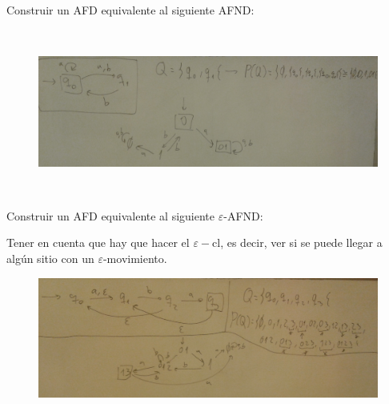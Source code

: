 \documentclass[twoside]{article}
\begin{document}
\begin{ejercicio}{11}
Construir un AFD equivalente al siguiente AFND:
\end{ejercicio}
\begin{solucion}\

\begin{figure}[h!]
\includegraphics[scale=0.2]{Automatas/11}
\end{figure}\
\end{solucion}

\newpage

\begin{ejercicio}{12}
Construir un AFD equivalente al siguiente $\varepsilon$-AFND:
\end{ejercicio}
\begin{solucion}
Tener en cuenta que hay que hacer el $\varepsilon-$cl, es decir, ver si se puede llegar a algún sitio con un $\varepsilon$-movimiento.

\begin{figure}[h!]
\includegraphics[scale=0.2]{Automatas/12}
\end{figure}\
\end{solucion}

\newpage
\end{document}
